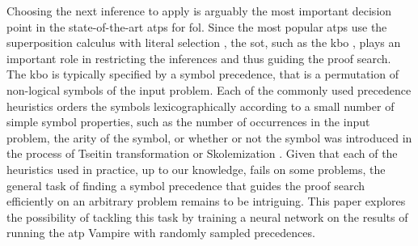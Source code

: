 




Choosing the next inference to apply is arguably the most important decision point in the state-of-the-art
\glspl{atp} for \gls{fol}.
Since the most popular \glspl{atp} use the superposition calculus with literal selection \cite{DBLP:journals/logcom/BachmairG94},
the \gls{sot}, such as the \gls{kbo} \cite{Knuth1983},
plays an important role in restricting the inferences and thus guiding the proof search.
The \gls{kbo} is typically specified by a symbol precedence,
that is a permutation of non-logical symbols of the input problem.
Each of the commonly used precedence heuristics orders the symbols
lexicographically according to a small number of simple
symbol properties,
such as the number of occurrences in the input problem,
the arity of the symbol, or
whether or not the symbol was introduced in the process of Tseitin transformation \cite{Tseitin1983} or Skolemization \cite{Harrison2009}.
Given that each of the heuristics used in practice, up to our knowledge, fails on some problems,
the general task of
finding a symbol precedence that guides the proof search efficiently on an arbitrary problem
remains to be intriguing.
This paper explores the possibility of tackling this task by training a neural network
on the results of running the \gls{atp} Vampire \cite{10.1007/978-3-642-39799-8_1} with randomly sampled precedences.

